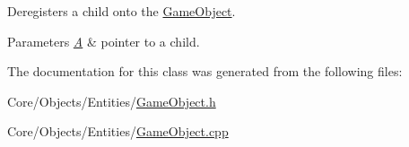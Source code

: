 Deregisters a child onto the \hyperlink{classDCEngine_1_1GameObject}{Game\-Object}. 


\begin{DoxyParams}{Parameters}
{\em \hyperlink{classA}{A}} & pointer to a child. \\
\hline
\end{DoxyParams}


The documentation for this class was generated from the following files\-:\begin{DoxyCompactItemize}
\item 
Core/\-Objects/\-Entities/\hyperlink{GameObject_8h}{Game\-Object.\-h}\item 
Core/\-Objects/\-Entities/\hyperlink{GameObject_8cpp}{Game\-Object.\-cpp}\end{DoxyCompactItemize}
